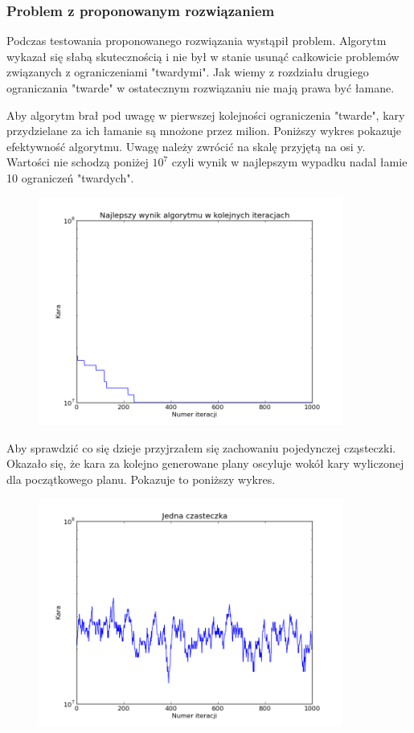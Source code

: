 \subsubsection{Problem z proponowanym rozwiązaniem}
\par Podczas testowania proponowanego rozwiązania wystąpił problem. Algorytm wykazał się słabą skutecznością i nie był w stanie usunąć całkowicie problemów związanych z ograniczeniami "twardymi". Jak wiemy z rozdziału drugiego ograniczania "twarde" w ostatecznym rozwiązaniu nie mają prawa być łamane.
\par Aby algorytm brał pod uwagę w pierwszej kolejności ograniczenia "twarde", kary przydzielane za ich łamanie są mnożone przez milion.
Poniższy wykres pokazuje efektywność algorytmu. Uwagę należy zwrócić na skalę przyjętą na osi y. Wartości nie schodzą poniżej $10^{7}$ czyli wynik w najlepszym wypadku nadal łamie 10 ograniczeń "twardych".
\begin{figure}[H]
\includegraphics[width=10cm]{img/standard_penalty.png}
\centering
\end{figure}
\par Aby sprawdzić co się dzieje przyjrzałem się zachowaniu pojedynczej cząsteczki. Okazało się, że kara za kolejno generowane plany oscyluje wokół kary wyliczonej dla początkowego planu. Pokazuje to poniższy wykres.  
\begin{figure}[H]
\includegraphics[width=10cm]{img/standard_particle.png}
\centering
\end{figure}
